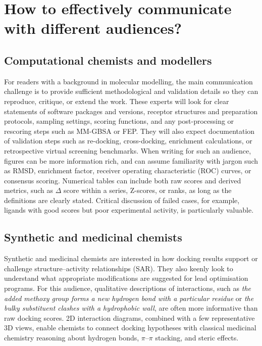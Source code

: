\documentclass[12pt]{article}
\begin{document}
\section{How to effectively communicate with different audiences?}

\subsection{Computational chemists and modellers}

For readers with a background in molecular modelling, the main communication challenge is to provide sufficient methodological and validation details so they can reproduce, critique, or extend the work.\cite{CH11_Berry2015,CH11_Kitchen2004,CH11_cosconati2010}  These experts will look for clear statements of software packages and versions, receptor structures and preparation protocols, sampling settings, scoring functions, and any post-processing or rescoring steps such as MM-GBSA or FEP\cite{CH11_Pagadala2017,CH11_Berry2015,CH11_EmpiricalScoring2018}. They will also expect documentation of validation steps such as re-docking, cross-docking, enrichment calculations, or retrospective virtual screening benchmarks\cite{CH11_Warren2006,CH11_Forli2015,CH11_Cheng2012}.  When writing for such an audience, figures can be more information rich, and can assume familiarity with jargon such as RMSD, enrichment factor, receiver operating characteristic (ROC) curves, or consensus scoring\cite{CH11_Forli2015,CH11_EmpiricalScoring2018,CH11_ConsensusDocking2023}.  Numerical tables can include both raw scores and derived metrics, such as $\Delta$ score within a series, Z-scores, or ranks, as long as the definitions are clearly stated\cite{CH11_EmpiricalScoring2018,CH11_Kitchen2004,CH11_Berry2015}.  Critical discussion of failed cases, for example, ligands with good scores but poor experimental activity, is particularly valuable\cite{CH11_BindingAffinity2018,CH11_IsItReliable2018,CH11_Plewczynski2011}. 

\subsection{Synthetic and medicinal chemists}

Synthetic and medicinal chemists are interested in how docking results support or challenge structure--activity relationships (SAR). They also keenly look to understand what appropriate modifications are suggested for lead optimisation programs\cite{CH11_Kitchen2004,CH11_Forli2015,CH11_cosconati2010}.  For this audience, qualitative descriptions of interactions, such as \emph{the added methoxy group forms a new hydrogen bond with a particular residue} or \emph{the bulky substituent clashes with a hydrophobic wall}, are often more informative than raw docking scores\cite{CH11_Berry2015,CH11_Glide2004,CH11_Kitchen2004}.  2D interaction diagrams, combined with a few representative 3D views, enable chemists to connect docking hypotheses with classical medicinal chemistry reasoning about hydrogen bonds, $\pi$--$\pi$ stacking, and steric effects\cite{CH11_Berry2015,CH11_Forli2015,CH11_zhu2022}.  
\end{document}
